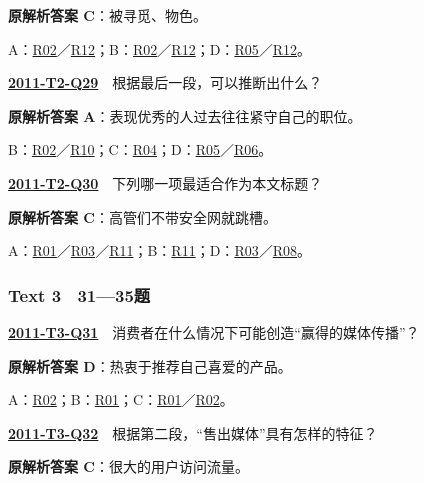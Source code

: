 \documentclass[11pt,a4paper]{article}
\begin{document}
\noindent\textbf{原解析答案 C}：被寻觅、物色。\par\nopagebreak
\noindent A：\hyperref[cat-R02]{R02}／\hyperref[cat-R12]{R12}；B：\hyperref[cat-R02]{R02}／\hyperref[cat-R12]{R12}；D：\hyperref[cat-R05]{R05}／\hyperref[cat-R12]{R12}。\par\smallskip
{}\label{idx-2011-T2-Q29}\noindent\textbf{\href{https://zj139.github.io/math-notes/english/fab88b1777828e64dff31c90/\#q29}{2011-T2-Q29}}　根据最后一段，可以推断出什么？\par\nopagebreak
\noindent\textbf{原解析答案 A}：表现优秀的人过去往往紧守自己的职位。\par\nopagebreak
\noindent B：\hyperref[cat-R02]{R02}／\hyperref[cat-R10]{R10}；C：\hyperref[cat-R04]{R04}；D：\hyperref[cat-R05]{R05}／\hyperref[cat-R06]{R06}。\par\smallskip
{}\label{idx-2011-T2-Q30}\noindent\textbf{\href{https://zj139.github.io/math-notes/english/fab88b1777828e64dff31c90/\#q30}{2011-T2-Q30}}　下列哪一项最适合作为本文标题？\par\nopagebreak
\noindent\textbf{原解析答案 C}：高管们不带安全网就跳槽。\par\nopagebreak
\noindent A：\hyperref[cat-R01]{R01}／\hyperref[cat-R03]{R03}／\hyperref[cat-R11]{R11}；B：\hyperref[cat-R11]{R11}；D：\hyperref[cat-R03]{R03}／\hyperref[cat-R08]{R08}。\par\smallskip
\clearpage
{}\subsubsection{Text 3　31—35题}
\label{idx-2011-T3-Q31}\noindent\textbf{\href{https://zj139.github.io/math-notes/english/f805d4b3fde383fcf2cf2e5c/\#q31}{2011-T3-Q31}}　消费者在什么情况下可能创造“赢得的媒体传播”？\par\nopagebreak
\noindent\textbf{原解析答案 D}：热衷于推荐自己喜爱的产品。\par\nopagebreak
\noindent A：\hyperref[cat-R02]{R02}；B：\hyperref[cat-R01]{R01}；C：\hyperref[cat-R01]{R01}／\hyperref[cat-R02]{R02}。\par\smallskip
{}\label{idx-2011-T3-Q32}\noindent\textbf{\href{https://zj139.github.io/math-notes/english/f805d4b3fde383fcf2cf2e5c/\#q32}{2011-T3-Q32}}　根据第二段，“售出媒体”具有怎样的特征？\par\nopagebreak
\noindent\textbf{原解析答案 C}：很大的用户访问流量。\par\nopagebreak
\end{document}

